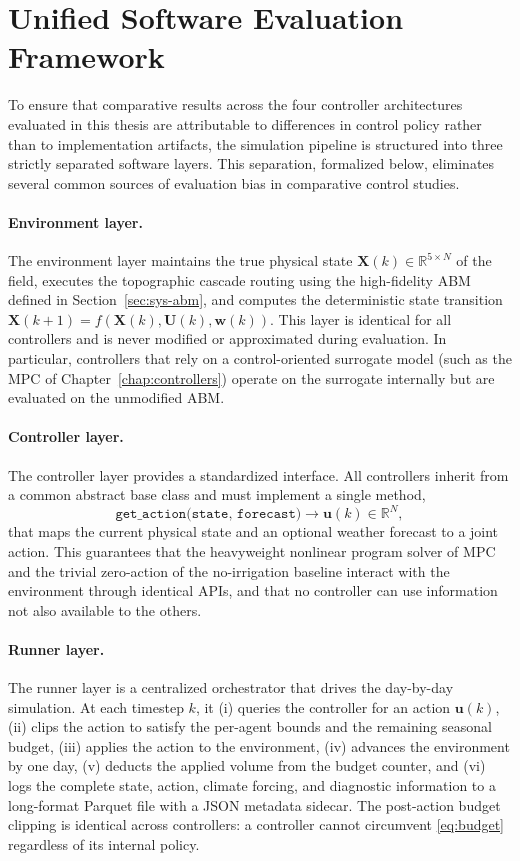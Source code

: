 \section{Unified Software Evaluation Framework}
\label{sec:sys-eval}

To ensure that comparative results across the four controller
architectures evaluated in this thesis are attributable to differences
in control policy rather than to implementation artifacts, the
simulation pipeline is structured into three strictly separated
software layers. This separation, formalized below, eliminates several
common sources of evaluation bias in comparative control studies.

\paragraph{Environment layer.}
The environment layer maintains the true physical state
$\mathbf{X}(k) \in \mathbb{R}^{5 \times N}$ of the field, executes the
topographic cascade routing using the high-fidelity ABM defined in
Section~\ref{sec:sys-abm}, and computes the deterministic state
transition $\mathbf{X}(k+1) = f(\mathbf{X}(k), \mathbf{U}(k), \mathbf{w}(k))$.
This layer is identical for all controllers and is never modified or
approximated during evaluation. In particular, controllers that rely
on a control-oriented surrogate model (such as the MPC of
Chapter~\ref{chap:controllers}) operate on the surrogate internally
but are evaluated on the unmodified ABM.

\paragraph{Controller layer.}
The controller layer provides a standardized interface. All controllers
inherit from a common abstract base class and must implement a single
method,
\[
\texttt{get\_action(state, forecast)} \to \mathbf{u}(k) \in \mathbb{R}^N,
\]
that maps the current physical state and an optional weather forecast
to a joint action. This guarantees that the heavyweight nonlinear
program solver of MPC and the trivial zero-action of the no-irrigation
baseline interact with the environment through identical APIs, and
that no controller can use information not also available to the
others.

\paragraph{Runner layer.}
The runner layer is a centralized orchestrator that drives the
day-by-day simulation. At each timestep $k$, it (i) queries the
controller for an action $\mathbf{u}(k)$, (ii) clips the action to
satisfy the per-agent bounds and the remaining seasonal budget,
(iii) applies the action to the environment, (iv) advances the
environment by one day, (v) deducts the applied volume from the
budget counter, and (vi) logs the complete state, action, climate
forcing, and diagnostic information to a long-format Parquet file with
a JSON metadata sidecar. The post-action budget clipping is identical
across controllers: a controller cannot circumvent
\eqref{eq:budget} regardless of its internal policy.

